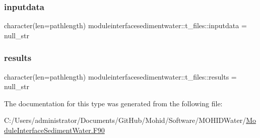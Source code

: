 \mbox{\label{structmoduleinterfacesedimentwater_1_1t__files_a0863fb6401802926bb1c729d95df47df}} 
\subsubsection{\texorpdfstring{inputdata}{inputdata}}
{\footnotesize\ttfamily character(len=pathlength) moduleinterfacesedimentwater\+::t\+\_\+files\+::inputdata = null\+\_\+str\hspace{0.3cm}{\ttfamily [private]}}

\mbox{\label{structmoduleinterfacesedimentwater_1_1t__files_abc4ad069042a82eac98587cb8b60711e}} 
\subsubsection{\texorpdfstring{results}{results}}
{\footnotesize\ttfamily character(len=pathlength) moduleinterfacesedimentwater\+::t\+\_\+files\+::results = null\+\_\+str\hspace{0.3cm}{\ttfamily [private]}}



The documentation for this type was generated from the following file\+:\begin{DoxyCompactItemize}
\item 
C\+:/\+Users/administrator/\+Documents/\+Git\+Hub/\+Mohid/\+Software/\+M\+O\+H\+I\+D\+Water/\mbox{\hyperlink{_module_interface_sediment_water_8_f90}{Module\+Interface\+Sediment\+Water.\+F90}}\end{DoxyCompactItemize}
